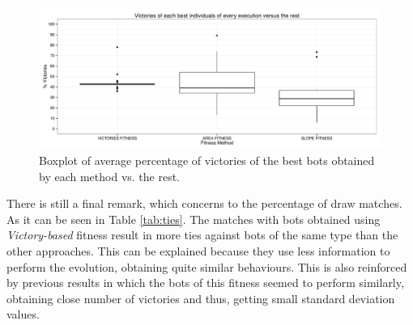 \documentclass[preprint]{elsarticle}
\begin{document}
 \begin{figure}[ht]
 \begin{center}
   \includegraphics[width=12cm]{nuevas_imgs/batallas_Boxplot.pdf}
 \end{center}
 \caption{Boxplot of average percentage of victories of the best bots obtained by each method vs. the rest.}
 \label{figura:boxplotvictories}
 \end{figure}


There is still a final remark, which concerns to the percentage of draw matches.
As it can be seen in Table \ref{tab:ties}. The matches with bots obtained using \textit{Victory-based}
fitness  result in more ties against bots of the same type than the
other approaches. %
This can be explained because they use less
information to perform the evolution, obtaining quite similar
behaviours. %
This is also reinforced by previous results in which the
bots of this fitness seemed to perform similarly, obtaining close
number of victories and thus, getting small standard deviation
values. 


\end{document}
